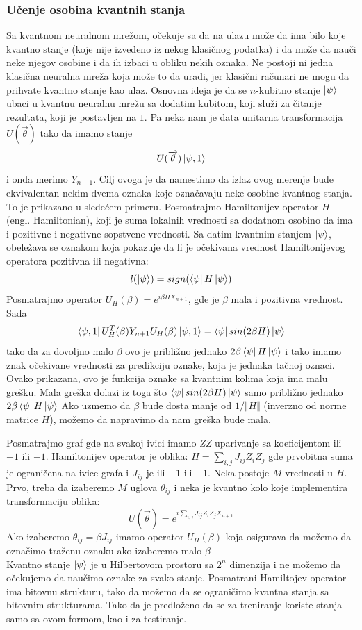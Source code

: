 \documentclass[12pt, letterpaper, oneside]{article}
\begin{document}
\subsubsection{Učenje osobina kvantnih stanja}
Sa kvantnom neuralnom mrežom, očekuje sa da na ulazu može da ima bilo koje kvantno stanje (koje nije izvedeno iz nekog klasičnog podatka)
i da može da nauči neke njegov osobine i da ih izbaci u obliku nekih oznaka. Ne postoji ni jedna klasična neuralna mreža koja može to da uradi, jer klasični računari ne mogu da prihvate kvantno stanje kao ulaz.
Osnovna ideja je da se $n$-kubitno stanje $\Ket{\psi}$ ubaci u kvantnu neuralnu mrežu sa dodatim kubitom, koji služi za čitanje rezultata, koji je postavljen na $1$.
Pa neka nam je data unitarna transformacija $U(\overrightarrow{\theta})$ tako da imamo stanje
\[
    U(\overrightarrow{\theta})\Ket{\psi,1}
\] 
i onda merimo $Y_{n+1}$. Cilj ovoga je da namestimo da izlaz ovog merenje bude ekvivalentan nekim dvema oznaka koje označavaju neke osobine kvantnog stanja.
To je prikazano u sledećem primeru.
Posmatrajmo Hamiltonijev operator $H$ (engl. Hamiltonian), koji je suma lokalnih vrednosti sa dodatnom osobino da ima i pozitivne i negativne sopstvene vrednosti.
Sa datim kvantnim stanjem $\ket{\psi}$, obeležava se oznakom koja pokazuje da li je očekivana vrednost Hamiltonijevog operatora pozitivna ili negativna:
\[
    l(\Ket{\psi}) = sign(\bra{\psi}H\Ket{\psi})
\]
Posmatrajmo operator $U_H(\beta) = e^{i\beta HX_{n+1}}$, gde je $\beta$ mala i pozitivna vrednost. Sada
\[
    \Bra{\psi,1}U_H^T(\beta)Y_{n+1}U_H(\beta)\Ket{\psi,1} = \bra{\psi}sin(2\beta H)\Ket{\psi}
\]
tako da za dovoljno malo $\beta$ ovo je približno jednako $2\beta\bra{\psi}H\Ket{\psi}$ i tako imamo znak očekivane vrednosti za 
predikciju oznake, koja je jednaka tačnoj oznaci. Ovako prikazana, ovo je funkcija oznake sa kvantnim kolima koja ima malu grešku.
Mala greška dolazi iz toga što $\bra{\psi}sin(2\beta H)\Ket{\psi}$ samo približno jednako $2\beta\bra{\psi}H\Ket{\psi}$
Ako uzmemo da $\beta$ bude dosta manje od $1/\Vert H \Vert$ (inverzno od norme matrice $H$), možemo da napravimo da nam greška bude mala.

Posmatrajmo graf gde na svakoj ivici imamo \textit{ZZ} uparivanje sa koeficijentom ili $+1$ ili $-1$.
Hamiltonijev operator je oblika: $H = \sum_{i,j}J_{ij}Z_iZ_j$ gde prvobitna suma je ograničena na ivice grafa i $J_{ij}$ je ili $+1$ ili $-1$.
Neka postoje $M$ vrednosti u $H$. Prvo, treba da izaberemo $M$ uglova $\theta_{ij}$ i neka je kvantno kolo koje implementira transformaciju oblika:
\[
    U(\overrightarrow{\theta}) = e^{i\sum_{i,j}J_{ij}Z_iZ_jX_{n+1}}
\]
Ako izaberemo $\theta_{ij}=\beta J_{ij}$ imamo operator $U_H(\beta)$ koja osigurava da možemo da označimo traženu oznaku ako izaberemo malo $\beta$ \\
Kvantno stanje $\Ket{\psi}$ je u Hilbertovom prostoru sa $2^n$ dimenzija i ne možemo da očekujemo da naučimo oznake za svako stanje.
Posmatrani Hamiltojev operator ima bitovnu strukturu, tako da možemo da se ograničimo kvantna stanja sa bitovnim strukturama.
Tako da je predloženo da se za treniranje koriste stanja samo sa ovom formom, kao i za testiranje.
\newpage
\end{document}
